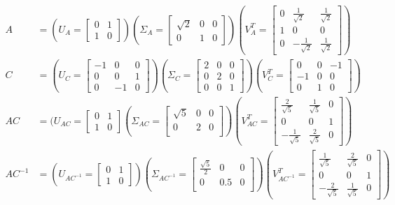 \begin{align}
A &= (U_A = \begin{bmatrix}
0& 1  \\
1 & 0
\end{bmatrix})(
\Sigma_A = \begin{bmatrix}
\sqrt{2}  &  0  & 0\\
0 & 1 & 0
\end{bmatrix})(
V^T_A = \begin{bmatrix}
0& \frac{1}{\sqrt{2}}& \frac{1}{\sqrt{2}}  \\
1 & 0 & 0 \\
0& -\frac{1}{\sqrt{2}}& \frac{1}{\sqrt{2}}  
\end{bmatrix}) \\
C &= 
(U_C = \begin{bmatrix}
-1 & 0 & 0  \\
0 & 0 & 1 \\
0 & -1 & 0
\end{bmatrix})
(\Sigma_C = \begin{bmatrix}
2& 0 & 0  \\
0 & 2 & 0 \\
0 & 0 & 1
\end{bmatrix})
(V^T_C = \begin{bmatrix}
0 & 0 & -1  \\
-1 & 0 & 0 \\
0 & 1 & 0
\end{bmatrix}) \\
AC &= 
(U_{AC} = \begin{bmatrix}
0 & 1 \\
1 & 0
\end{bmatrix}
(\Sigma_{AC} = \begin{bmatrix}
\sqrt{5}  &   0 & 0\\
0 & 2 & 0  \\
\end{bmatrix})
(V^T_{AC} = \begin{bmatrix}
\frac{2}{\sqrt{5}}&\frac{1}{\sqrt{5}} & 0 \\
0& 0 & 1 \\
-\frac{1}{\sqrt{5}} & \frac{2}{\sqrt{5}} & 0
\end{bmatrix}) \\
AC^{-1} &= 
(U_{AC^{-1}} = \begin{bmatrix}
0 & 1 \\
1 & 0
\end{bmatrix})
(\Sigma_{AC^{-1}} = \begin{bmatrix}
\frac{\sqrt{5}}{2}  &   0 & 0\\
0 & 0.5 & 0  \\
\end{bmatrix})
(V^T_{AC^{-1}} = \begin{bmatrix}
\frac{1}{\sqrt{5}}&\frac{2}{\sqrt{5}} & 0 \\
0 & 0 & 1 \\
-\frac{2}{\sqrt{5}} & \frac{1}{\sqrt{5}} & 0
\end{bmatrix})
\end{align}

